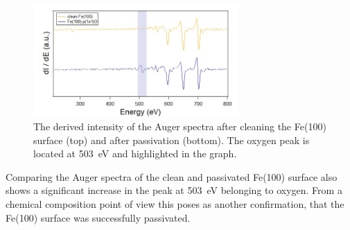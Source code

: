 \begin{figure}[h]
    \centering
    \includegraphics[width = 0.7\textwidth]{Plots/Auger.png}
    \caption{The derived intensity of the Auger spectra after cleaning the Fe(100) surface (top) and after passivation (bottom). The oxygen peak is located at \qty{503}{eV} and highlighted in the graph.}
    \label{fig:auger_FeO}
\end{figure}
\FloatBarrier
Comparing the Auger spectra of the clean and passivated Fe(100) surface also shows a significant increase in the peak at \qty{503}{eV} belonging to oxygen.
From a chemical composition point of view this poses as another confirmation, that the Fe(100) surface was successfully passivated.

